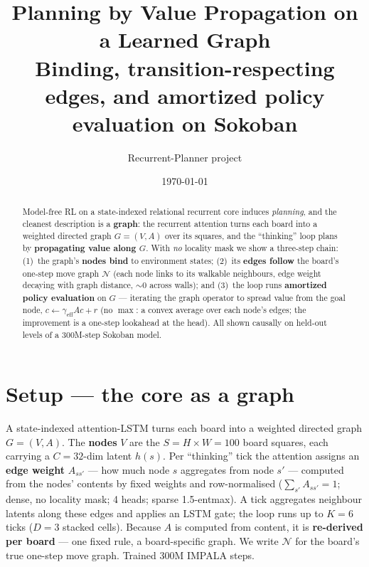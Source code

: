 \documentclass[11pt]{article}
\title{\vspace{-1.2em}\bf Planning by Value Propagation on a Learned Graph\\[2pt]
\large Binding, transition-respecting edges, and amortized policy evaluation on Sokoban}
\author{Recurrent-Planner project}
\date{\vspace{-0.6em}\today}
\newcommand{\NN}{\mathcal{N}}
\begin{document}
\maketitle
\vspace{-2.2em}

\begin{abstract}
\noindent Model-free RL on a state-indexed relational recurrent core induces \emph{planning}, and the
cleanest description is a \textbf{graph}: the recurrent attention turns each board into a weighted directed
graph $G{=}(V,A)$ over its squares, and the ``thinking'' loop plans by \textbf{propagating value along $G$}.
With \emph{no} locality mask we show a three-step chain: (1)~the graph's \textbf{nodes bind} to environment
states; (2)~its \textbf{edges follow} the board's one-step move graph $\NN$ (each node links to its walkable
neighbours, edge weight decaying with graph distance, ${\sim}0$ across walls); and (3)~the loop runs
\textbf{amortized policy evaluation} on $G$ --- iterating the graph operator to spread value from the goal
node, $c{\leftarrow}\gamma_{\mathrm{eff}}Ac{+}r$ (no $\max$: a convex average over each node's edges; the
improvement is a one-step lookahead at the head). All shown causally on held-out levels of a 300M-step
Sokoban model.
\end{abstract}

\vspace{-0.6em}
\section*{Setup --- the core as a graph}
\vspace{-2pt}
A state-indexed attention-LSTM turns each board into a weighted directed graph $G{=}(V,A)$. The
\textbf{nodes} $V$ are the $S{=}H{\times}W{=}100$ board squares, each carrying a $C{=}32$-dim latent $h(s)$.
Per ``thinking'' tick the attention assigns an \textbf{edge weight} $A_{ss'}$ --- how much node $s$
aggregates from node $s'$ --- computed from the nodes' contents by fixed weights and row-normalised
($\textstyle\sum_{s'}A_{ss'}{=}1$; dense, no locality mask; 4 heads; sparse 1.5-entmax). A tick aggregates
neighbour latents along these edges and applies an LSTM gate; the loop runs up to $K{=}6$ ticks ($D{=}3$
stacked cells). Because $A$ is computed from content, it is \textbf{re-derived per board} --- one fixed rule,
a board-specific graph. We write $\NN$ for the board's true one-step move graph. Trained 300M IMPALA steps.
\end{document}
